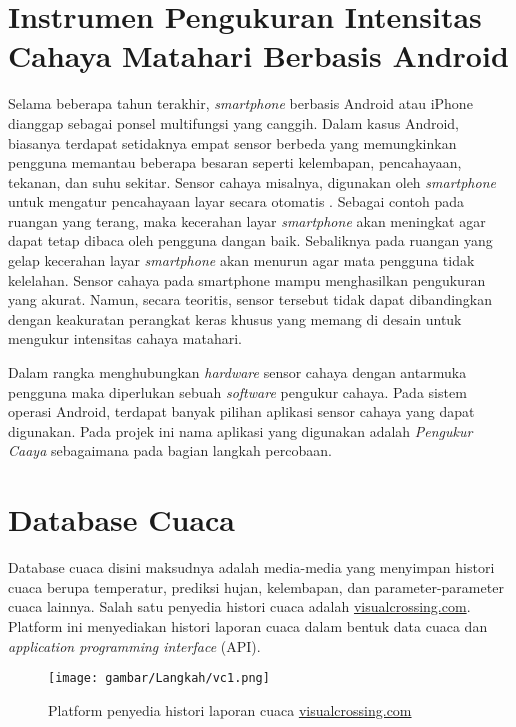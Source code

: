 \section{Instrumen Pengukuran Intensitas Cahaya Matahari Berbasis Android}
Selama beberapa tahun terakhir, \textit{smartphone} berbasis Android atau iPhone dianggap sebagai ponsel multifungsi yang canggih. Dalam kasus Android, biasanya terdapat setidaknya empat sensor berbeda yang memungkinkan pengguna memantau beberapa besaran seperti kelembapan, pencahayaan, tekanan, dan suhu sekitar. Sensor cahaya misalnya, digunakan oleh \textit{smartphone} untuk mengatur pencahayaan layar secara otomatis \cite{esmaeili2019mobile}. Sebagai contoh pada ruangan yang terang, maka kecerahan layar \textit{smartphone} akan meningkat agar dapat tetap dibaca oleh pengguna dangan baik. Sebaliknya pada ruangan yang gelap kecerahan layar \textit{smartphone} akan menurun agar mata pengguna tidak kelelahan. Sensor cahaya pada smartphone mampu menghasilkan pengukuran yang akurat. Namun, secara teoritis, sensor tersebut tidak dapat dibandingkan dengan keakuratan perangkat keras khusus yang memang di desain untuk mengukur intensitas cahaya matahari.

Dalam rangka menghubungkan \textit{hardware} sensor cahaya dengan antarmuka pengguna maka diperlukan sebuah \textit{software} pengukur cahaya. Pada sistem operasi Android, terdapat banyak pilihan aplikasi sensor cahaya yang dapat digunakan. Pada projek ini nama aplikasi yang digunakan adalah \textit{Pengukur Caaya} sebagaimana pada bagian langkah percobaan.

\section{Database Cuaca}
Database cuaca disini maksudnya adalah media-media yang menyimpan histori cuaca berupa temperatur, prediksi hujan, kelembapan, dan parameter-parameter cuaca lainnya. Salah satu penyedia histori cuaca adalah \href{https://www.visualcrossing.com/about}{visualcrossing.com}. Platform ini menyediakan histori laporan cuaca dalam bentuk data cuaca dan \textit{application programming interface} (API).
\begin{figure}[H]
    \centering
    \texttt{[image: gambar/Langkah/vc1.png]}
    \caption{Platform penyedia histori laporan cuaca \href{https://www.visualcrossing.com/about}{visualcrossing.com}}
\end{figure}

